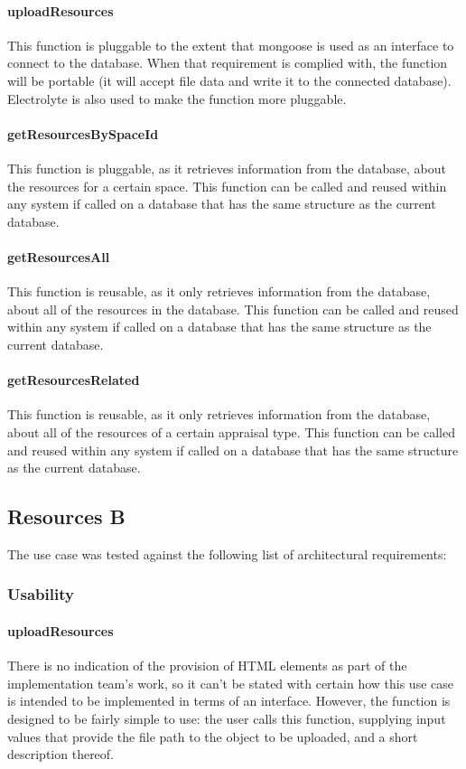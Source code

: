 \documentclass[a4paper]{article}
\begin{document}
\paragraph{uploadResources}
This function is pluggable to the extent that mongoose is used as an interface to connect to the database. When that requirement is complied with, the function will be portable (it will accept file data and write it to the connected database). Electrolyte is also used to make the function more pluggable.

\paragraph{getResourcesBySpaceId}
This function is pluggable, as it retrieves information from the database, about the resources for a certain space. This function can be called and reused within any system if called on a database that has the same structure as the current database.

\paragraph{getResourcesAll}
This function is reusable, as it only retrieves information from the database, about all of the resources in the database. This function can be called and reused within any system if called on a database that has the same structure as the current database.

\paragraph{getResourcesRelated}
This function is reusable, as it only retrieves information from the database, about all of the resources of a certain appraisal type. This function can be called and reused within any system if called on a database that has the same structure as the current database.


\subsection {Resources B}
The use case was tested against the following list of architectural requirements:
\subsubsection {Usability}

\paragraph{uploadResources}
There is no indication of the provision of HTML elements as part of the implementation team’s work, so it can’t be stated with certain how this use case is intended to be implemented in terms of an interface. However, the function is designed to be fairly simple to use: the user calls this function, supplying input values that provide the file path to the object to be uploaded, and a short description thereof.
\end{document}
